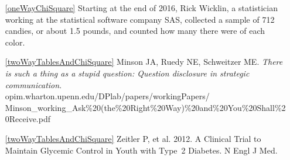 \begin{itemize}
\item[\ref{oneWayChiSquare}]
   Starting at the end of 2016, Rick Wicklin, a statistician working at the statistical software company SAS, collected a sample of 712 candies, or about 1.5 pounds, and counted how many there were of each color.   \\



\item[\ref{twoWayTablesAndChiSquare}]
    Minson JA, Ruedy NE, Schweitzer ME.
    \emph{There is such a thing as a stupid question:
    Question disclosure in strategic communication}. \\
    {\small{}
        {opim.wharton.upenn.edu/DPlab/papers/workingPapers/}}\\
    {\small{}
        {Minson\_working\_Ask\%20(the\%20Right\%20Way)\%20and\%20You\%20Shall\%20Receive.pdf}}

\item[\ref{twoWayTablesAndChiSquare}]
    Zeitler P, et al. 2012.
    A Clinical Trial to Maintain Glycemic Control in Youth
    with Type~2 Diabetes.
    N Engl J Med.

\end{itemize}








